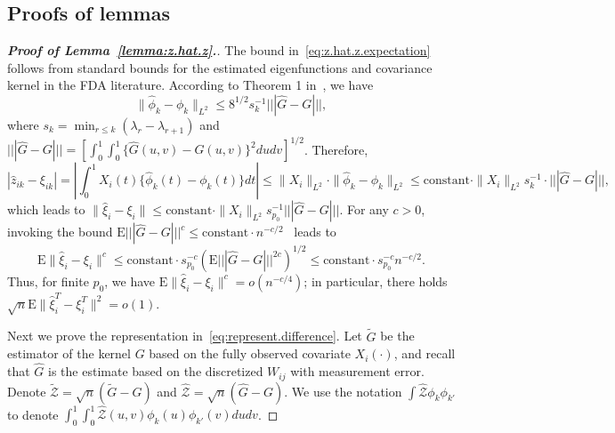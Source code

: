 \documentclass[times,sort&compress,3p]{elsarticle}
\theoremstyle{plain}%
\theoremstyle{definition}
\newcommand{\const}{\text{constant} \cdot}
\newcommand{\bxi}{{\xi}}
\begin{document}
\subsection{Proofs of lemmas} \label{subsection:proof.lemmas}





\begin{proof}[\textbf{\upshape Proof of Lemma~\ref{lemma:z.hat.z}.}]
The bound in~\eqref{eq:z.hat.z.expectation} follows from standard bounds for the estimated eigenfunctions and covariance kernel in the FDA literature.  According to Theorem 1 in~\cite{Hal+Hos:06}, we have 
\begin{equation}
	\|\widehat{\phi}_k - \phi_k\|_{L^2} \leq 8^{1/2} s_k^{-1} |||\widehat{G} - G |||, 
\end{equation}
where $s_k = \min_{r \leq k} (\lambda_r - \lambda_{r + 1})$ and $|||\widehat{G} - G ||| = [\int_0^1\int_0^1 \{\widehat{G}(u,v) - G(u,v)\}^2 du dv]^{1/2}$. Therefore,
\begin{equation}
	|\widehat{z}_{ik} - \xi_{ik}| = \left|\int_0^1 X_i(t) \{\widehat{\phi}_k(t) - \phi_k(t)\}dt \right| \leq \|X_i\|_{L^2} \cdot \|\widehat{\phi}_k - \phi_k\|_{L^2} \leq \const \|X_i\|_{L^2} s_k^{-1} \cdot |||\widehat{G} - G |||, 
\end{equation}
which leads to $
\|\widehat{\bxi}_i - \bxi_{i} \| \leq \const \|X_i\|_{L^2} s_{p_0}^{-1}|||\widehat{G} - G |||. 
$
For any $c > 0$, invoking the bound $\text{E}|||\widehat{G} - G |||^c \leq \const n^{-c/2}$~\cite[Lemma 3.3]{Hal:09} leads to 
\begin{equation}
	\text{E} \|\widehat{\bxi}_i - \bxi_{i} \|^c \leq \const s_{p_0}^{-c} (\text{E}|||\widehat{G} - G |||^{2c})^{1/2} \leq \const s_{p_0}^{-c} n^{-c/2}. 
\end{equation}
Thus, for finite $p_0$, we have $\text{E} \|\widehat{\bxi}_i - \bxi_{i} \|^c = o(n^{-c/4})$; in particular, there holds $\sqrt{n} \text{E} \| \widehat{\bxi}^T_i  - \bxi^T_i\|^2 = o(1)$. 


Next we prove the representation in~\eqref{eq:represent.difference}. Let $\widetilde{G}$ be the estimator of the kernel $G$ based on the fully observed covariate $X_i(\cdot)$, and recall that $\widehat{G}$ is the estimate based on the discretized  $W_{i j}$ with measurement error. Denote $\widetilde{\mathcal{Z}} = \sqrt{n}(\widetilde{G} - G)$ and $\widehat{\mathcal{Z}} = \sqrt{n}(\widehat{G} - G)$. We use the notation $\int \widehat{\mathcal{Z}} \phi_k \phi_{k'}$ to denote $\int_0^1 \int_0^1 \widehat{\mathcal{Z}}(u, v) \phi_k(u) \phi_{k'}(v) du dv$. 


\end{proof}
\end{document}
